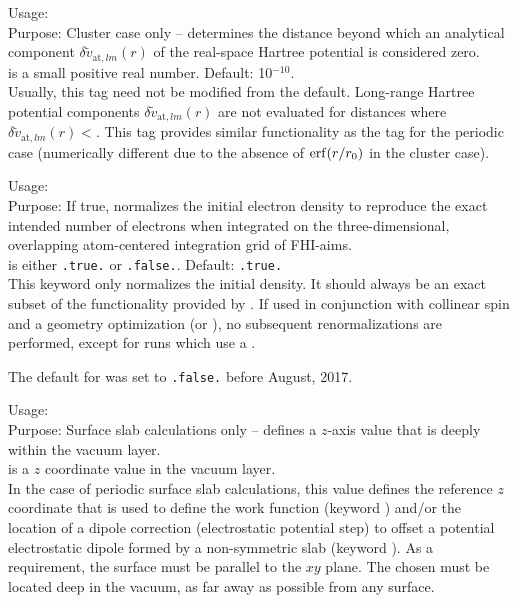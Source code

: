 {
  \noindent
  Usage:   \\[1.0ex]
  Purpose: Cluster case only -- determines the distance beyond which
    an analytical component $\delta\tilde{v}_{\text{at},lm}(r)$ of the
    real-space Hartree potential is considered zero. \\[1.0ex]
   is a small positive real number. Default:
    10$^{-10}$. \\
}
Usually, this tag need not be modified from the default. Long-range
Hartree potential components $\delta\tilde{v}_{\text{at},lm}(r)$ are
  not evaluated for distances where
  $\delta\tilde{v}_{\text{at},lm}(r)<$. This tag
  provides similar functionality as the 
   tag for the periodic case
  (numerically different due to the absence of $\mathop{\mathrm{erf}}(r/r_0)$ in the
  cluster case). 

{
  \noindent
  Usage:   \\[1.0ex]
  Purpose: If true, normalizes the initial electron density to reproduce the
   exact intended number of electrons when integrated on the three-dimensional,
   overlapping atom-centered integration grid of FHI-aims. \\[1.0ex]
   is either \texttt{.true.} or \texttt{.false.}. Default:
    \texttt{.true.}  \\
}
This keyword only normalizes the initial density. It should always be an exact
subset of the functionality provided by .
If used in conjunction with collinear spin and a geometry optimization (or
), no subsequent renormalizations are performed, except
for runs which use a .

The default for  was set to \texttt{.false.} 
before August, 2017.

{
  \noindent
  Usage:   \\[1.0ex]
  Purpose: Surface slab calculations only -- defines a $z$-axis value that is
  deeply within the vacuum layer.  \\[1.0ex]  is a
  $z$ coordinate value in the vacuum layer.  \\ 
}
%
In the case of periodic surface slab calculations, this value defines the
reference $z$ coordinate that is used to define the work function (keyword
) and/or the location of a dipole correction
(electrostatic potential step) to offset a potential electrostatic dipole
formed by a non-symmetric slab (keyword ).  
As a requirement, the surface must be parallel to the $xy$ plane. The chosen
 must be located deep in the vacuum, as far away as
possible from any surface. 

